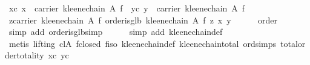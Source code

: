 \begin{isabellebody}
\ xc{}\ {}x\ {}\ carrier\ {}kleene{}chain\ A\ f{}{}\ \ yc{}\ {}y\ {}\ carrier\ {}kleene{}chain\ A\ f{}{}\isanewline
\ \ \isamarkupfalse%
\ {}{}z{}carrier\ {}kleene{}chain\ A\ f{}{}\ order{}is{}glb\ {}kleene{}chain\ A\ f{}\ z\ {}x{}\ y{}{}\isanewline
\ \ \ \ \isamarkupfalse%
\ order\ \isamarkupfalse%
\ {}simp\ add{}\ order{}is{}glb{}simp{}\isanewline
\ \ \ \ \isamarkupfalse%
\ {}simp\ add{}\ kleene{}chain{}def{}\isanewline
\ \ \ \ \isamarkupfalse%
\ {}metis\ {}lifting{}\ cl{}A\ f{}closed\ f{}iso\ kleene{}chain{}def\ kleene{}chain{}total\ ord{}simps{}{}{}\ total{}order{}totality\ xc\ yc{}\isanewline

\end{isabellebody}
